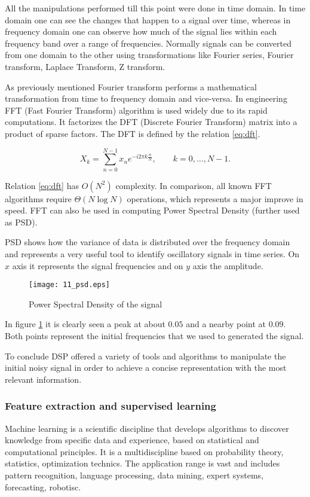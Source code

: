 All the manipulations performed till this point were done in time domain. In time domain one can see the changes that happen to a signal over time, whereas in frequency domain one can observe how much of the signal lies within each frequency band over a range of frequencies. Normally signals can be converted from one domain to the other using transformations like Fourier series, Fourier transform, Laplace Transform, Z transform. 

As previously mentioned Fourier transform performs a mathematical transformation from time to frequency domain and vice-versa. In engineering FFT (Fast Fourier Transform) algorithm is used widely due to its rapid computations. It factorizes the DFT (Discrete Fourier Transform) matrix into a product of sparse factors.  The DFT is defined by the relation \eqref{eq:dft}.

\begin{equation} \label{eq:dft}
 X_k = \sum_{n=0}^{N-1} x_n e^{-i2\pi k\frac{n}{N}}, \qquad k= 0,\ldots , N-1.
\end{equation}

Relation \eqref{eq:dft} has $O(N^2)$ complexity. In comparison, all known FFT algorithms require $\Theta (N \log N)$ operations, which represents a major improve in speed. FFT can also be used in computing Power Spectral Density (further used as PSD).

PSD shows how the variance of data is distributed over the frequency domain and represents a very useful tool to identify oscillatory signals in time series. On $x$ axis it represents the signal frequencies and on $y$ axis the amplitude. 

\begin{figure}[!ht]
\centering
  \texttt{[image: 11\_psd.eps]}
\caption{Power Spectral Density of the signal}
\label{fig:psd}
\end{figure}

In figure \ref{fig:psd} it is clearly seen a peak at about $0.05$ and a nearby point at $0.09$. Both points represent the initial frequencies that we used to generated the signal. 

To conclude DSP offered a variety of tools and algorithms to manipulate the initial noisy signal in order to achieve a concise representation with the most relevant information.

\subsubsection{Feature extraction and supervised learning}
Machine learning is a scientific discipline that develops algorithms to discover knowledge from specific data and experience, based on statistical and computational principles. It is a multidiscipline based on probability theory, statistics, optimization technics. The application range is vast and includes pattern recognition, language processing, data mining, expert systems, forecasting, robotisc. 

